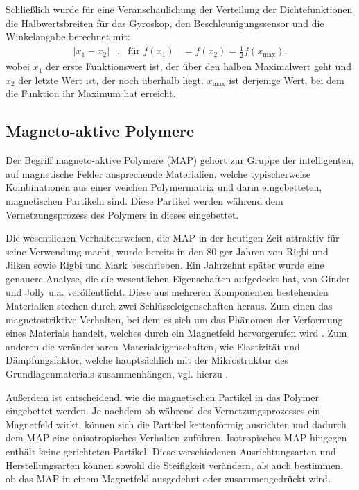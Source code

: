 Schließlich wurde für eine Veranschaulichung der Verteilung der Dichtefunktionen die Halbwertsbreiten für das Gyroskop, den Beschleunigungssensor und die Winkelangabe berechnet mit:
\begin{align}
	|x_1 - x_2|&, & \text{für } f(x_1)&=f(x_2)=\frac{1}{2}f(x_\text{max}).
\end{align}
wobei $x_1$ der erste Funktionswert ist, der über den halben Maximalwert geht und $x_2$ der letzte Wert ist, der noch überhalb liegt. $x_\text{max}$ ist derjenige Wert, bei dem die Funktion ihr Maximum hat erreicht. 

\FloatBarrier

\subsection{Magneto-aktive Polymere}\label{kap_MAP}
Der Begriff magneto-aktive Polymere (MAP) gehört zur Gruppe der intelligenten, auf magnetische Felder ansprechende Materialien, welche typischerweise Kombinationen aus einer weichen Polymermatrix und darin eingebetteten, magnetischen Partikeln sind. Diese Partikel werden während dem Vernetzungsprozess des Polymers in dieses eingebettet. 

Die wesentlichen Verhaltensweisen, die MAP in der heutigen Zeit attraktiv für seine Verwendung macht, wurde bereits in den 80-ger Jahren von Rigbi und Jilken \cite{Rigbi1} sowie Rigbi und Mark \cite{Rigbi2} beschrieben. Ein Jahrzehnt später wurde eine genauere Analyse, die die wesentlichen Eigenschaften aufgedeckt hat, von Ginder und Jolly u.a. \cite{ginder} veröffentlicht. 
Diese aus mehreren Komponenten bestehenden Materialien stechen durch zwei Schlüsseleigenschaften heraus. 
Zum einen das magnetostriktive Verhalten, bei dem es sich um das Phänomen der Verformung eines Materials handelt, welches durch ein Magnetfeld hervorgerufen wird \cite{Martin_2006}.
Zum anderen die veränderbaren Materialeigenschaften, wie Elastizität und Dämpfungsfaktor, welche hauptsächlich mit der Mikrostruktur des Grundlagenmaterials zusammenhängen, vgl. hierzu \cite{Varga1,Varga2}.

Außerdem ist entscheidend, wie die magnetischen Partikel in das Polymer eingebettet werden. Je nachdem ob während des Vernetzungsprozesses ein Magnetfeld wirkt, können sich die Partikel kettenförmig ausrichten und dadurch dem MAP eine anisotropisches Verhalten zuführen. Isotropisches MAP hingegen enthält keine gerichteten Partikel. Diese verschiedenen Ausrichtungsarten und Herstellungsarten können sowohl die Steifigkeit verändern, als auch bestimmen, ob das MAP in einem Magnetfeld ausgedehnt oder zusammengedrückt wird. 

